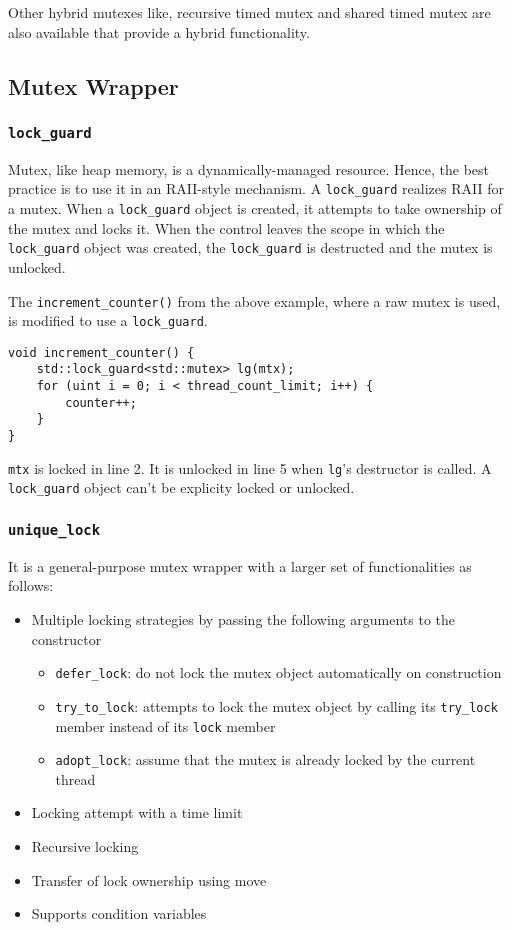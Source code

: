 \documentclass{scrartcl}
\begin{document}
Other hybrid mutexes like, recursive timed mutex and shared timed mutex are also available that provide a hybrid functionality.

\subsection{Mutex Wrapper}

\subsubsection{\texttt{lock_guard}}
Mutex, like heap memory, is a dynamically-managed resource. Hence, the best practice is to use it in an RAII-style mechanism. A \texttt{lock_guard} realizes RAII for a mutex. When a \texttt{lock_guard} object is created, it attempts to take ownership of the mutex and locks it. When the control leaves the scope in which the \texttt{lock_guard} object was created, the \texttt{lock_guard} is destructed and the mutex is unlocked. 

The \texttt{increment_counter()} from the above example, where a raw mutex is used, is modified to use a \texttt{lock_guard}. 

\begin{verbatim}
void increment_counter() {
    std::lock_guard<std::mutex> lg(mtx);
    for (uint i = 0; i < thread_count_limit; i++) {
        counter++;
    }
}
\end{verbatim}

\texttt{mtx} is locked in line 2. It is unlocked in line 5 when \texttt{lg}'s destructor is called. A \texttt{lock_guard} object can't be explicity locked or unlocked. 

\subsubsection{\texttt{unique_lock}}
It is a general-purpose mutex wrapper with a larger set of functionalities as follows:

\begin{itemize}
\item Multiple locking strategies by passing the following arguments to the constructor
	\begin{itemize}
	\item \texttt{defer_lock}: do not lock the mutex object automatically on construction
	\item \texttt{try_to_lock}: attempts to lock the mutex object by calling its \texttt{try_lock} member instead of its \texttt{lock} member
	\item \texttt{adopt_lock}: assume that the mutex is already locked by the current thread
	\end{itemize}
\item Locking attempt with a time limit
\item Recursive locking
\item Transfer of lock ownership using move
\item Supports condition variables
\end{itemize}
\end{document}
